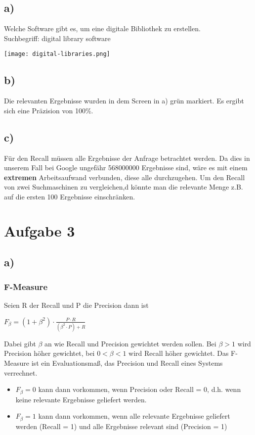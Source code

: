 \documentclass[11pt,a4paper,parskip=half ]{scrartcl}
\begin{document}
	\subsection*{a)}
	Welche Software gibt es, um eine digitale Bibliothek zu erstellen. \\
	Suchbegriff:  \glqq{}digital library software\grqq{}
	
	\begin{center}
		\texttt{[image: digital-libraries.png]}
	\end{center}
	
	\subsection*{b)}
	Die relevanten Ergebnisse wurden in dem Screen in a) grün markiert. Es ergibt
	sich eine Präzision von 100\%. 
	
	\subsection*{c)}
	Für den Recall müssen alle Ergebnisse der Anfrage betrachtet werden. Da dies in
	unserem Fall bei Google \glqq{}ungefähr 568000000\grqq{} Ergebnisse sind, wäre
	es mit einem \textbf{extremen} Arbeitsaufwand verbunden, diese alle
	durchzugehen. Um den Recall von zwei Suchmaschinen zu vergleichen,d könnte man
	die relevante Menge z.B. auf die ersten 100 Ergebnisse einschränken.
	
	\section*{Aufgabe 3}
	\subsection*{a)}
	\subsubsection*{F-Measure} Seien R der Recall und P die Precision dann ist
	\begin{center}
		$F_{\beta}=(1+\beta^{2})\cdot\frac{P\cdot R}{(\beta^{2}\cdot P)+R}$
	\end{center}
	Dabei gibt $\beta$ an wie Recall und Precision gewichtet werden sollen. Bei
	$\beta>1$ wird Precision höher gewichtet, bei $0<\beta<1$ wird Recall höher
	gewichtet. Das F-Measure ist ein Evaluationsmaß, das Precision und Recall eines
	Systems verrechnet.
	\begin{itemize}
		\item $F_{\beta}=0$ kann dann vorkommen, wenn Precision oder Recall = 0, d.h.
		wenn keine relevante Ergebnisse geliefert werden.
		\item $F_{\beta}=1$ kann dann vorkommen, wenn alle relevante Ergebnisse
		geliefert werden (Recall = 1) und alle Ergebnisse relevant sind (Precision = 1)
	\end{itemize}
	
\end{document}
